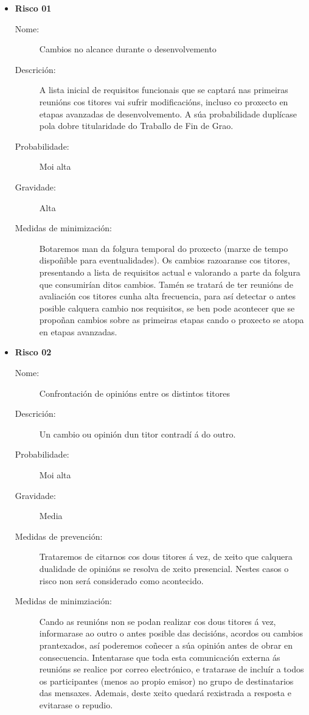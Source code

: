 \begin{itemize}

\item \textbf{Risco 01}
\begin{description}
\item[Nome:] Cambios no alcance durante o desenvolvemento
\item[Descrición:] A lista inicial de requisitos funcionais que se captará nas primeiras reunións cos titores vai sufrir modificacións, incluso co proxecto en etapas avanzadas de desenvolvemento. A súa probabilidade duplícase pola dobre titularidade do Traballo de Fin de Grao.
\item[Probabilidade:] Moi alta
\item[Gravidade:] Alta
\item[Medidas de minimización:] Botaremos man da folgura temporal do proxecto (marxe de tempo dispoñible para eventualidades). Os cambios razoaranse cos titores, presentando a lista de requisitos actual e valorando a parte da folgura que consumirían ditos cambios. Tamén se tratará de ter reunións de avaliación cos titores cunha alta frecuencia, para así detectar o antes posible calquera cambio nos requisitos, se ben pode acontecer que se propoñan cambios sobre as primeiras etapas cando o proxecto se atopa en etapas avanzadas.
\end{description}

\item \textbf{Risco 02}
\begin{description}
\item[Nome:] Confrontación de opinións entre os distintos titores
\item[Descrición:] Un cambio ou opinión dun titor contradí á do outro.
\item[Probabilidade:] Moi alta
\item[Gravidade:] Media
\item[Medidas de prevención:] Trataremos de citarnos cos dous titores á vez, de xeito que calquera dualidade de opinións se resolva de xeito presencial. Nestes casos o risco non será considerado como acontecido.
\item[Medidas de minimziación:] Cando as reunións non se podan realizar cos dous titores á vez, informarase ao outro o antes posible das decisións, acordos ou cambios prantexados, así poderemos coñecer a súa opinión antes de obrar en consecuencia. Intentarase que toda esta comunicación externa ás reunións se realice por correo electrónico, e tratarase de incluír a todos os participantes (menos ao propio emisor) no grupo de destinatarios das mensaxes. Ademais, deste xeito quedará rexistrada a resposta e evitarase o repudio.
\end{description}


\end{itemize}
